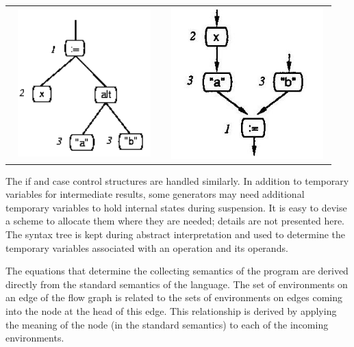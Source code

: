 \begin{flushleft}
\tablefirsthead{}
\tablehead{}
\tabletail{}
\tablelasttail{}
\begin{xtabular}{m{2.5in}m{3in}}
  \includegraphics[width=2.2492in,height=2.2398in]{kw/figure3-3.png}   &
  \includegraphics[width=2.4154in,height=2.3in]{kw/figure3-4.png}  \\
\end{xtabular}
\end{flushleft}

The if and case control structures are handled similarly. In addition
to temporary variables for intermediate results, some generators may
need additional temporary variables to hold internal states during
suspension. It is easy to devise a scheme to allocate them where they
are needed; details are not presented here. The syntax tree is kept
during abstract interpretation and used to determine the temporary
variables associated with an operation and its operands.

The equations that determine the collecting semantics of the program
are derived directly from the standard semantics of the language. The
set of environments on an edge of the flow graph is related to the
sets of environments on edges coming into the node at the head of this
edge. This relationship is derived by applying the meaning of the node
(in the standard semantics) to each of the incoming environments.

